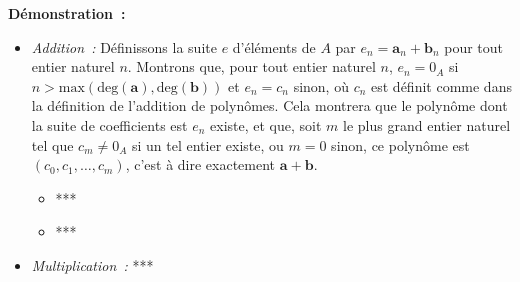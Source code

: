 \medskip

\noindent\textbf{Démonstration :} 
\begin{itemize}[nosep]
    \item \textit{Addition :} 
        Définissons la suite $e$ d'éléments de $A$ par $e_n = \mathbf{a}_n + \mathbf{b}_n$ pour tout entier naturel $n$.
        Montrons que, pour tout entier naturel $n$, $e_n = 0_A$ si $n > \mathrm{max}(\mathrm{deg}(\mathbf{a}), \mathrm{deg}(\mathbf{b}))$ et $e_n = c_n$ sinon, où $c_n$ est définit comme dans la définition de l'addition de polynômes. 
        Cela montrera que le polynôme dont la suite de coefficients est $e_n$ existe, et que, soit $m$ le plus grand entier naturel tel que $c_m \neq 0_A$ si un tel entier existe, ou $m = 0$ sinon, ce polynôme est $(c_0, c_1, \dots, c_m)$, c'est à dire exactement $\mathbf{a} + \mathbf{b}$.
        \begin{itemize}[nosep]
            \item ***
            \item ***
        \end{itemize}
    \item \textit{Multiplication :} ***
\end{itemize}

\medskip

